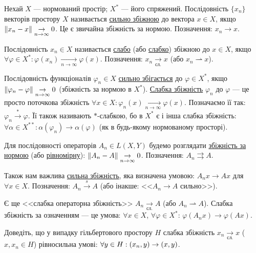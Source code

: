 
\begin{theory}
    Нехай $X$ --- нормований простір; $X^*$ --- його спряжений. Послідовність $\{x_n\}$ 
    векторів простору $X$ називається \ul{сильно збіжною} до вектора $x \in X$, якщо 
    $\left\lVert x_n - x\right\rVert \underset{n \rightarrow \infty}{\rightarrow} 0$. Це є звичайна збіжність 
    за нормою. Позначення: $x_n \rightarrow x$.

    Послідовність $x_n \in X$ називається \ul{слабо} (або \ul{слабко}) збіжною до $x \in X$, 
    якщо $\forall \varphi \in X^* : \varphi(x_n) \underset{n \rightarrow \infty}{\rightarrow} 
    \varphi(x)$. Позначення: $x_n \underset{\text{сл.}}{\rightarrow} x$ 
    (або $x_n \rightharpoonup x$).

    Послідовність функціоналів $\varphi_n \in X$ \ul{сильно збігається} до $\varphi \in X^*$, 
    якщо $\left\lVert\varphi_n - \varphi\right\rVert \underset{n \rightarrow \infty}{\rightarrow} 0$ 
    (збіжність за нормою в $X^*$). \ul{Слабка збіжність} $\varphi_n$ до $\varphi$ --- 
    це просто поточкова збіжність  $\forall x \in X : \varphi_n(x) \underset{n \rightarrow \infty}{\rightarrow} \varphi(x)$.
    Позначаємо її так: $\varphi_n \overset{*}{\rightarrow} \varphi$. 
    Її також називають $*$-слабкою, бо в $X^*$ є і інша слабка збіжність: $\forall \alpha 
    \in X^{**} : \alpha(\varphi_n) \rightarrow \alpha(\varphi)$ (як в будь-якому 
    нормованому просторі).

    Для послідовності операторів $A_n \in L(X, Y)$ будемо розглядати \ul{збіжність за нормою} 
    (або \ul{рівномірну}): $\left\lVert A_n - A\right\rVert \underset{n \rightarrow \infty}{\rightarrow} 0$. 
    Позначення: $A_n \rightrightarrows A$.

    Також нам важлива \ul{сильна збіжність}, яка визначена умовою: 
    $A_n x \rightarrow Ax$ для $\forall x \in X$. Позначення: $A_n \overset{s}{\rightarrow} A$ 
    (або інакше: <<$A_n \rightarrow A$ сильно>>).

    Є ще <<слабка операторна збіжність>> $A_n \underset{\text{сл.}}{\rightarrow} A$ 
    (або $A_n \rightharpoonup A$). Слабка збіжність за означенням --- це умова: 
    $\forall x \in X$, $\forall \varphi \in X^*$: $\varphi(A_nx) \rightarrow \varphi(Ax)$.
\end{theory}

\begin{exercise}
    Доведіть, що у випадку гільбертового простору $H$ слабка збіжність $x_n 
    \underset{\text{сл.}}{\rightarrow} x$ ($x, x_n \in H$) рівносильна умові: 
    $\forall y \in H : \left(x_n, y\right) \rightarrow \left(x, y\right)$.
\end{exercise}

